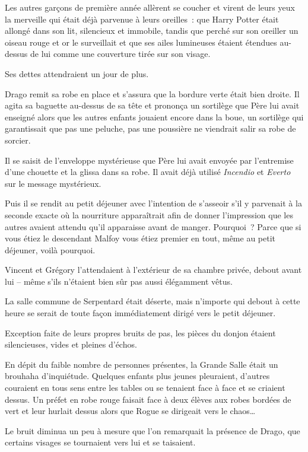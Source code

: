 Les autres garçons de première année allèrent se coucher et virent de leurs yeux la merveille qui était déjà parvenue à leurs oreilles~: que Harry Potter était allongé dans son lit, silencieux et immobile, tandis que perché sur son oreiller un oiseau rouge et or le surveillait et que ses ailes lumineuses étaient étendues au-dessus de lui comme une couverture tirée sur son visage.

Ses dettes attendraient un jour de plus.


Drago remit sa robe en place et s'assura que la bordure verte était bien droite.
Il agita sa baguette au-dessus de sa tête et prononça un sortilège que Père lui avait enseigné alors que les autres enfants jouaient encore dans la boue, un sortilège qui garantissait que pas une peluche, pas une poussière ne viendrait salir sa robe de sorcier.

Il se saisit de l'enveloppe mystérieuse que Père lui avait envoyée par l'entremise d'une chouette et la glissa dans sa robe.
Il avait déjà utilisé \emph{Incendio} et \emph{Everto} sur le message mystérieux.

Puis il se rendit au petit déjeuner avec l'intention de s'asseoir s'il y parvenait à la seconde exacte où la nourriture apparaîtrait afin de donner l'impression que les autres avaient attendu qu'il apparaisse avant de manger.
Pourquoi~?
Parce que si vous étiez le descendant Malfoy vous étiez premier en tout, même au petit déjeuner, voilà pourquoi.

Vincent et Grégory l'attendaient à l'extérieur de sa chambre privée, debout avant lui -- même s'ils n'étaient bien sûr pas aussi élégamment vêtus.

La salle commune de Serpentard était déserte, mais n'importe qui debout à cette heure se serait de toute façon immédiatement dirigé vers le petit déjeuner.

Exception faite de leurs propres bruits de pas, les pièces du donjon étaient silencieuses, vides et pleines d'échos.

En dépit du faible nombre de personnes présentes, la Grande Salle était un brouhaha d'inquiétude.
Quelques enfants plus jeunes pleuraient, d'autres couraient en tous sens entre les tables ou se tenaient face à face et se criaient dessus.
Un préfet en robe rouge faisait face à deux élèves aux robes bordées de vert et leur hurlait dessus alors que Rogue se dirigeait vers le chaos…

Le bruit diminua un peu à mesure que l'on remarquait la présence de Drago, que certains visages se tournaient vers lui et se taisaient.

